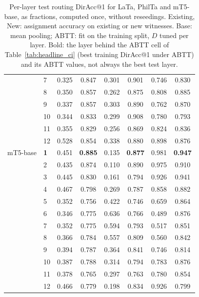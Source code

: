 \begin{table}[t]
\begin{tabular}{llcccccc}
 & 7 & 0.325 & 0.847 & 0.301 & 0.901 & 0.746 & 0.830 \\
 & 8 & 0.350 & 0.857 & 0.262 & 0.875 & 0.808 & 0.885 \\
 & 9 & 0.337 & 0.857 & 0.303 & 0.890 & 0.762 & 0.870 \\
 & 10 & 0.344 & 0.833 & 0.299 & 0.908 & 0.780 & 0.793 \\
 & 11 & 0.355 & 0.829 & 0.256 & 0.869 & 0.824 & 0.836 \\
 & 12 & 0.528 & 0.854 & 0.338 & 0.880 & 0.898 & 0.876 \\
\midrule
mT5-base & \textbf{1} & 0.451 & \textbf{0.885} & 0.135 & \textbf{0.877} & 0.981 & \textbf{0.947} \\
 & 2 & 0.435 & 0.874 & 0.110 & 0.890 & 0.975 & 0.910 \\
 & 3 & 0.445 & 0.830 & 0.161 & 0.794 & 0.926 & 0.941 \\
 & 4 & 0.467 & 0.798 & 0.269 & 0.787 & 0.858 & 0.882 \\
 & 5 & 0.352 & 0.756 & 0.422 & 0.746 & 0.659 & 0.864 \\
 & 6 & 0.346 & 0.775 & 0.636 & 0.766 & 0.489 & 0.876 \\
 & 7 & 0.352 & 0.775 & 0.594 & 0.793 & 0.517 & 0.851 \\
 & 8 & 0.366 & 0.784 & 0.557 & 0.809 & 0.560 & 0.842 \\
 & 9 & 0.394 & 0.787 & 0.364 & 0.841 & 0.746 & 0.814 \\
 & 10 & 0.387 & 0.788 & 0.314 & 0.794 & 0.783 & 0.876 \\
 & 11 & 0.378 & 0.765 & 0.297 & 0.763 & 0.780 & 0.854 \\
 & 12 & 0.466 & 0.779 & 0.198 & 0.834 & 0.926 & 0.799 \\
\bottomrule
\end{tabular}
\caption{Per-layer test routing DirAcc@1 for LaTa, PhilTa and mT5-base, as fractions, computed once, without reseedings. Existing, New: assignment accuracy on existing or new witnesses. Base: mean pooling; ABTT: fit on the training split, $D$ tuned per layer. Bold: the layer behind the ABTT cell of Table~\ref{tab:headline_ci} (best training DirAcc@1 under ABTT) and its ABTT values, not always the best test layer.}
\label{tab:taskB_ranking_main}
\end{table}
